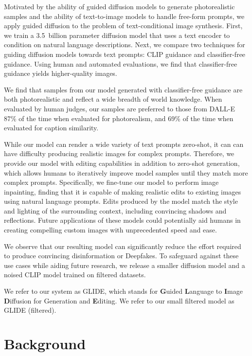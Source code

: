 \documentclass{article}
\newcommand{\modelname}{GLIDE}
\begin{document}
Motivated by the ability of guided diffusion models to generate photorealistic samples and the ability of text-to-image models to handle free-form prompts, we apply guided diffusion to the problem of text-conditional image synthesis. First, we train a 3.5~billion parameter diffusion model that uses a text encoder to condition on natural language descriptions. Next, we compare two techniques for guiding diffusion models towards text prompts: CLIP guidance and classifier-free guidance. Using human and automated evaluations, we find that classifier-free guidance yields higher-quality images.

We find that samples from our model generated with classifier-free guidance are both photorealistic and reflect a wide breadth of world knowledge. When evaluated by human judges, our samples are preferred to those from DALL-E \citep{dalle} 87\% of the time when evaluated for photorealism, and 69\% of the time when evaluated for caption similarity.  

While our model can render a wide variety of text prompts zero-shot, it can can have difficulty producing realistic images for complex prompts. Therefore, we provide our model with editing capabilities in addition to zero-shot generation, which allows humans to iteratively improve model samples until they match more complex prompts. Specifically, we fine-tune our model to perform image inpainting, finding that it is capable of making realistic edits to existing images using natural language prompts. Edits produced by the model match the style and lighting of the surrounding context, including convincing shadows and reflections. Future applications of these models could potentially aid humans in creating compelling custom images with unprecedented speed and ease.

We observe that our resulting model can significantly reduce the effort required to produce convincing disinformation or Deepfakes. To safeguard against these use cases while aiding future research, we release a smaller diffusion model and a noised CLIP model trained on filtered datasets.

We refer to our system as \modelname{}, which stands for \textbf{G}uided \textbf{L}anguage to \textbf{I}mage \textbf{D}iffusion for Generation and \textbf{E}diting. We refer to our small filtered model as \modelname{} (filtered).

\section{Background}
\label{sec:background}
\end{document}
